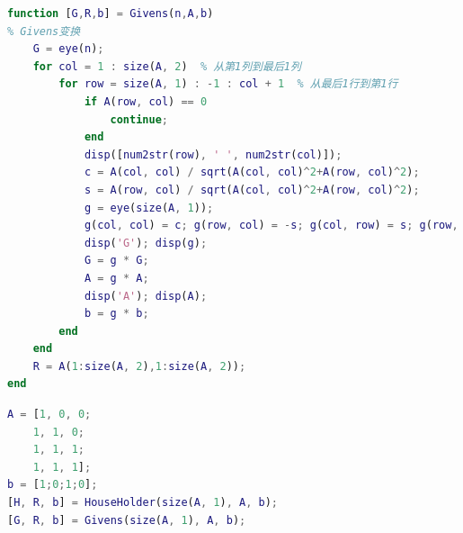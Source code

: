 \documentclass[12pt]{ctexart}
\begin{document}
\begin{lstlisting}[language = MATLAB]
function [G,R,b] = Givens(n,A,b)
% Givens变换
	G = eye(n);
	for col = 1 : size(A, 2)  % 从第1列到最后1列
		for row = size(A, 1) : -1 : col + 1  % 从最后1行到第1行
			if A(row, col) == 0
				continue;
			end
			disp([num2str(row), ' ', num2str(col)]);
			c = A(col, col) / sqrt(A(col, col)^2+A(row, col)^2);
			s = A(row, col) / sqrt(A(col, col)^2+A(row, col)^2);
			g = eye(size(A, 1));
			g(col, col) = c; g(row, col) = -s; g(col, row) = s; g(row, row) = c;
			disp('G'); disp(g);
			G = g * G;
			A = g * A;
			disp('A'); disp(A);
			b = g * b;
		end
	end
	R = A(1:size(A, 2),1:size(A, 2));
end
\end{lstlisting}

\begin{lstlisting}[language = MATLAB]
A = [1, 0, 0;
	1, 1, 0;
	1, 1, 1;
	1, 1, 1];
b = [1;0;1;0];
[H, R, b] = HouseHolder(size(A, 1), A, b);
[G, R, b] = Givens(size(A, 1), A, b);
\end{lstlisting}
\newpage
\end{document}

